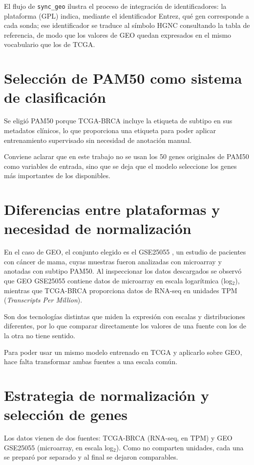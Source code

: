 \documentclass[12pt, a4paper]{report}
\begin{document}
El flujo de \texttt{sync\_geo} ilustra el proceso de integración de identificadores: la plataforma (GPL) indica, mediante el identificador Entrez, qué gen corresponde a cada sonda; ese identificador se traduce al símbolo HGNC consultando la tabla de referencia, de modo que los valores de GEO quedan expresados en el mismo vocabulario que los de TCGA.

\section{Selección de PAM50 como sistema de clasificación}

Se eligió PAM50 porque TCGA-BRCA incluye la etiqueta de subtipo en sus metadatos clínicos, lo que proporciona una etiqueta para poder aplicar entrenamiento supervisado sin necesidad de anotación manual.

Conviene aclarar que en este trabajo no se usan los 50 genes originales de PAM50 como variables de entrada, sino que se deja que el modelo seleccione los genes más importantes de los disponibles.

\section{Diferencias entre plataformas y necesidad de normalización}
En el caso de GEO, el conjunto elegido es el GSE25055 \cite{hatzis_genomic_2011}, un estudio de pacientes con cáncer de mama, cuyas muestras fueron analizadas con microarray y anotadas con subtipo PAM50. Al inspeccionar los datos descargados se observó que GEO GSE25055 contiene datos de microarray en escala logarítmica (log$_2$), mientras que TCGA-BRCA proporciona datos de RNA-seq en unidades TPM (\textit{Transcripts Per Million}).

Son dos tecnologías distintas que miden la expresión con escalas y distribuciones diferentes, por lo que comparar directamente los valores de una fuente con los de la otra no tiene sentido.

Para poder usar un mismo modelo entrenado en TCGA y aplicarlo sobre GEO, hace falta transformar ambas fuentes a una escala común.

\section{Estrategia de normalización y selección de genes}

Los datos vienen de dos fuentes: TCGA-BRCA (RNA-seq, en TPM) y GEO GSE25055 (microarray, en escala log$_2$). Como no comparten unidades, cada una se preparó por separado y al final se dejaron comparables.
\end{document}
